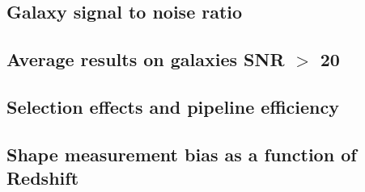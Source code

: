 \documentclass[useAMS,usenatbib]{mn2e}
\begin{document}
\subsection{Galaxy signal to noise ratio}\label{sec:SNR}


\subsection{Average results on galaxies SNR $>$ 20}



\subsection{Selection effects and pipeline efficiency }


\subsection{Shape measurement bias as a function of Redshift}

\end{document}
